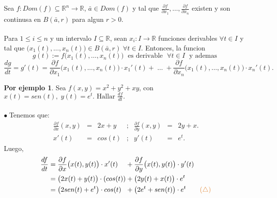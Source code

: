 \documentclass{article}
\theoremstyle{definition}
\theoremstyle{definition}
\newtheorem*{ej}{Por ejemplo}
\theoremstyle{remark}
\newcommand\bl{$\bullet\;$}
\begin{document}
\begin{teo}
  Sea $f : Dom(f) \subseteq \mathbb{R}^n \to \mathbb{R}$, $\bar{a} \in Dom(f)$ y tal que $\frac{\partial f}{\partial x_1},\dots,\frac{\partial f}{\partial x_n}$ existen y son continusa en $B(\bar{a},r)$ para algun $r>0$.\\\\
  Para $1 \leq i \leq n$ y un intervalo $I \subseteq \mathbb{R}$, sean $x_i : I \to \mathbb{R}$ funciones derivables $\forall t \in I$ y tal que $\big(x_1(t),\dots,x_n(t)\big) \in B(\bar{a},r) \; \forall t \in I.$ Entonces, la funcion \[
    g(t) := f\big(x_1(t), \dots, x_n (t)\big) \; \text{ es derivable } \; \forall t \in I \; \text{ y ademas }
    \] \[
    \frac{dg}{dt}=g'(t)= \frac{\partial f}{\partial x_1}\big(x_1(t),\dots,x_n(t)\big)\cdot x_1'(t) + \;  \dots \; + \frac{\partial f}{\partial x_n}\big(x_1(t),\dots,x_n(t)\big)\cdot x_n'(t). 
  \]
\end{teo}
\begin{figure}[h]
\centering
\def\svgwidth{1.5\textwidth}
\makebox[\textwidth]{
}
\end{figure} \pagebreak
\begin{ej}
  Sea $f(x,y)=x^2+y^2+xy$, con \mbox{$x(t)=sen(t), \; y(t)=e^t. \text{ Hallar } \frac{df}{dt}.$}\\\\
  \bl Tenemos que:  $$\begin{array}{lclclcl}
      \frac{\partial f}{\partial x}(x,y) & = & 2x+y & ; & \frac{\partial f}{\partial y}(x,y) & = & 2y+x. \\
                                         x'(t) & = & cos(t) & ; & y'(t) & = &  e^t.
                                         \end{array}$$ Luego, \[ 
                                         \begin{alignedat}{10}
                                           \frac{df}{dt} & = \frac{\partial f }{\partial x} \big(x(t),y(t)\big) \cdot x'(t) && + \frac{\partial f }{\partial y} \big(x(t),y(t)\big) \cdot y'(t) \\ 
                                                         & = \big(2x(t)+y(t)\big) \cdot (cos(t)) && + \big(2y(t)+x(t)\big) \cdot e^t \\ 
                                                         & = \big(2sen(t)+e^t\big) \cdot cos(t) && + \big(2e^t+sen(t)\big)\cdot e^t \quad \quad \textcolor{rojop2}{(\triangle)}
                                         \end{alignedat}
                                       \]
                                    
\end{ej}
\end{document}

